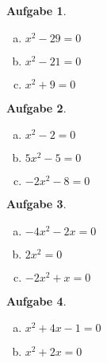 \documentclass[12pt]{article}
\theoremstyle{note}
\newtheorem{aufgabe}{Aufgabe}
\begin{document}
\begin{flushleft}
\begin{aufgabe} ~ \ 
\begin{multicols}{3} 
\begin{enumerate}[a)] 
\item $x^{2} - 29 = 0$\\
\item $x^{2} - 21 = 0$\\
\item $x^{2} + 9 = 0$\\
\end{enumerate} 
\end{multicols} 
\end{aufgabe}\vspace{1em}\begin{aufgabe} ~ \ 
\begin{multicols}{3} 
\begin{enumerate}[a)] 
\item $x^{2} - 2 = 0$\\
\item $5 x^{2} - 5 = 0$\\
\item $- 2 x^{2} - 8 = 0$\\
\end{enumerate} 
\end{multicols} 
\end{aufgabe}\vspace{1em}\begin{aufgabe} ~ \ 
\begin{multicols}{3} 
\begin{enumerate}[a)] 
\item $- 4 x^{2} - 2 x = 0$\\
\item $2 x^{2} = 0$\\
\item $- 2 x^{2} + x = 0$\\
\end{enumerate} 
\end{multicols} 
\end{aufgabe}\vspace{1em}\begin{aufgabe} ~ \ 
\begin{multicols}{3} 
\begin{enumerate}[a)] 
\item $x^{2} + 4 x - 1 = 0$\\
\item $x^{2} + 2 x = 0$\\

\end{enumerate}
\end{multicols}
\end{aufgabe}
\end{flushleft}
\end{document}
